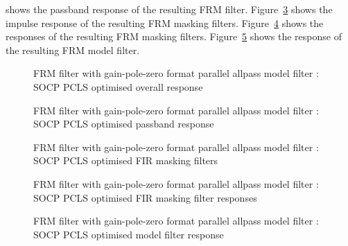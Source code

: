 \documentclass[a4paper,twoside,10pt,english]{report}
\begin{document}
shows the passband response of the resulting FRM filter. 
Figure~\ref{fig:iir-frm-parallel-allpass-socp-slb-pcls-masking-filters} 
shows the impulse response of the resulting FRM masking filters. 
Figure~\ref{fig:iir-frm-parallel-allpass-socp-slb-pcls-masking-response} 
shows the responses of the resulting FRM masking filters. 
Figure~\ref{fig:iir-frm-parallel-allpass-socp-slb-pcls-model-response} 
shows the response of the resulting FRM model filter. 
\begin{figure}[!htbp]
\begin{center}
\scalebox{0.7}{}
\caption{FRM filter with gain-pole-zero format parallel allpass model filter : SOCP PCLS optimised overall response}
\label{fig:iir-frm-parallel-allpass-socp-slb-pcls-overall-response}
\end{center}
\end{figure}
\begin{figure}[!htbp]
\begin{center}
\scalebox{0.7}{}
\caption{FRM filter with gain-pole-zero format parallel allpass model filter : SOCP PCLS optimised passband response}
\label{fig:iir-frm-parallel-allpass-socp-slb-pcls-passband-response}
\end{center}
\end{figure}
\begin{figure}[!htbp]
\begin{center}
\scalebox{0.7}{}
\caption{FRM filter with gain-pole-zero format parallel allpass model filter : SOCP PCLS optimised FIR masking filters}
\label{fig:iir-frm-parallel-allpass-socp-slb-pcls-masking-filters}
\end{center}
\end{figure}
\begin{figure}[!htbp]
\begin{center}
\scalebox{0.7}{}
\caption{FRM filter with gain-pole-zero format parallel allpass model filter : SOCP PCLS optimised FIR masking filter responses}
\label{fig:iir-frm-parallel-allpass-socp-slb-pcls-masking-response}
\end{center}
\end{figure}
\begin{figure}[!htbp]
\begin{center}
\scalebox{0.7}{}
\caption{FRM filter with gain-pole-zero format parallel allpass model filter : SOCP PCLS optimised model filter response}
\label{fig:iir-frm-parallel-allpass-socp-slb-pcls-model-response}
\end{center}
\end{figure}
\clearpage
\end{document}
